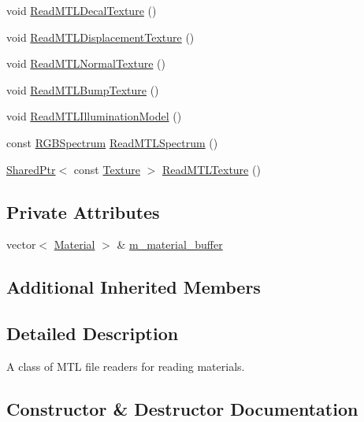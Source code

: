 \begin{DoxyCompactItemize}
void \hyperlink{classmage_1_1_m_t_l_reader_a578df3a55c79fba9d46616791b2e5539}{Read\+M\+T\+L\+Decal\+Texture} ()
\item 
void \hyperlink{classmage_1_1_m_t_l_reader_a9d4f8dea5a5582c5e7b788149110800c}{Read\+M\+T\+L\+Displacement\+Texture} ()
\item 
void \hyperlink{classmage_1_1_m_t_l_reader_ae44a5704a09edb722f99a480a58c807a}{Read\+M\+T\+L\+Normal\+Texture} ()
\item 
void \hyperlink{classmage_1_1_m_t_l_reader_acf7aacf933f842d3e14af92d161acd5b}{Read\+M\+T\+L\+Bump\+Texture} ()
\item 
void \hyperlink{classmage_1_1_m_t_l_reader_a77bbb659fe66e9bad451281dbd0c49d7}{Read\+M\+T\+L\+Illumination\+Model} ()
\item 
const \hyperlink{structmage_1_1_r_g_b_spectrum}{R\+G\+B\+Spectrum} \hyperlink{classmage_1_1_m_t_l_reader_a607a55ab2e68d3bc9b879d7e3377f0e3}{Read\+M\+T\+L\+Spectrum} ()
\item 
\hyperlink{namespacemage_a1e01ae66713838a7a67d30e44c67703e}{Shared\+Ptr}$<$ const \hyperlink{classmage_1_1_texture}{Texture} $>$ \hyperlink{classmage_1_1_m_t_l_reader_a36dd3bbfd989698c9caeacc059d03e69}{Read\+M\+T\+L\+Texture} ()
\end{DoxyCompactItemize}
\subsection*{Private Attributes}
\begin{DoxyCompactItemize}
\item 
vector$<$ \hyperlink{structmage_1_1_material}{Material} $>$ \& \hyperlink{classmage_1_1_m_t_l_reader_a6382e0e9fce6581b129d18f5d82994c2}{m\+\_\+material\+\_\+buffer}
\end{DoxyCompactItemize}
\subsection*{Additional Inherited Members}


\subsection{Detailed Description}
A class of M\+TL file readers for reading materials. 

\subsection{Constructor \& Destructor Documentation}
\hypertarget{classmage_1_1_m_t_l_reader_a924f813cca170e2592a6e7d2a3255be8}{}\label{classmage_1_1_m_t_l_reader_a924f813cca170e2592a6e7d2a3255be8} 
